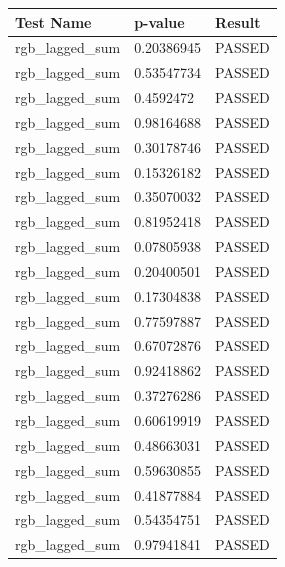 \documentclass[conference]{IEEEtran}
\begin{document}
\begin{center}
\begin{table}
\renewcommand{\arraystretch}{1.2}
\centering
\begin{tabular}{|l|l|l|}
\hline
Test Name                              & p-value    & Result \\ \hline
rgb\_lagged\_sum                       & 0.20386945 & PASSED \\ \hline
rgb\_lagged\_sum                       & 0.53547734 & PASSED \\ \hline
rgb\_lagged\_sum                       & 0.4592472  & PASSED \\ \hline
rgb\_lagged\_sum                       & 0.98164688 & PASSED \\ \hline
rgb\_lagged\_sum                       & 0.30178746 & PASSED \\ \hline
rgb\_lagged\_sum                       & 0.15326182 & PASSED \\ \hline
rgb\_lagged\_sum                       & 0.35070032 & PASSED \\ \hline
rgb\_lagged\_sum                       & 0.81952418 & PASSED \\ \hline
rgb\_lagged\_sum                       & 0.07805938 & PASSED \\ \hline
rgb\_lagged\_sum                       & 0.20400501 & PASSED \\ \hline
rgb\_lagged\_sum                       & 0.17304838 & PASSED \\ \hline
rgb\_lagged\_sum                       & 0.77597887 & PASSED \\ \hline
rgb\_lagged\_sum                       & 0.67072876 & PASSED \\ \hline
rgb\_lagged\_sum                       & 0.92418862 & PASSED \\ \hline
rgb\_lagged\_sum                       & 0.37276286 & PASSED \\ \hline
rgb\_lagged\_sum                       & 0.60619919 & PASSED \\ \hline
rgb\_lagged\_sum                       & 0.48663031 & PASSED \\ \hline
rgb\_lagged\_sum                       & 0.59630855 & PASSED \\ \hline
rgb\_lagged\_sum                       & 0.41877884 & PASSED \\ \hline
rgb\_lagged\_sum                       & 0.54354751 & PASSED \\ \hline
rgb\_lagged\_sum                       & 0.97941841 & PASSED \\ \hline

\end{tabular}
\end{table}
\end{center}
\end{document}
